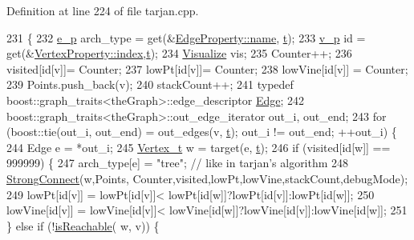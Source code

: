 Definition at line 224 of file tarjan.\+cpp.


\begin{DoxyCode}
231                                             \{
232     \hyperlink{utilities_8h_afdd46ecdd7dd04aa38394e7af744a510}{e\_p} arch\_type = \textcolor{keyword}{get}(&\hyperlink{struct_utility_structs_1_1_edge_property_a0701d898f719b1efbf795d80f503de81}{EdgeProperty::name}, \hyperlink{class_tarjan_a54b0703f885a3514ea0bf4cdbc7fdaad}{t});
233     \hyperlink{utilities_8h_a3f4959b3d837fa6351a9414c79280286}{v\_p} \textcolor{keywordtype}{id} = \textcolor{keyword}{get}(&\hyperlink{struct_utility_structs_1_1_vertex_property_a636cb729438e999aa3d9a17ac39d8641}{VertexProperty::index},\hyperlink{class_tarjan_a54b0703f885a3514ea0bf4cdbc7fdaad}{t});
234     \hyperlink{class_visualize}{Visualize} vis;
235     Counter++;
236     visited[\textcolor{keywordtype}{id}[v]]= Counter;
237     lowPt[\textcolor{keywordtype}{id}[v]]= Counter;
238     lowVine[\textcolor{keywordtype}{id}[v]] = Counter;
239     Points.push\_back(v);
240     stackCount++;
241     \textcolor{keyword}{typedef} boost::graph\_traits<theGraph>::edge\_descriptor \hyperlink{class_graph_component_aa7517b2af08aa717324076a645c73fe6}{Edge};
242     boost::graph\_traits<theGraph>::out\_edge\_iterator out\_i, out\_end;
243     \textcolor{keywordflow}{for} (boost::tie(out\_i, out\_end) = out\_edges(v, \hyperlink{class_tarjan_a54b0703f885a3514ea0bf4cdbc7fdaad}{t}); out\_i != out\_end; ++out\_i) \{
244         Edge e = *out\_i;
245         \hyperlink{utilities_8h_a344cd987714d06997f0becda3c96d6e2}{Vertex\_t} w = target(e, \hyperlink{class_tarjan_a54b0703f885a3514ea0bf4cdbc7fdaad}{t});
246         \textcolor{keywordflow}{if} (visited[\textcolor{keywordtype}{id}[w]] == 999999) \{
247             arch\_type[e] = \textcolor{stringliteral}{"tree"}; \textcolor{comment}{// like in tarjan's algorithm}
248             \hyperlink{class_tarjan_ac76fd1419a2de2dbf34c6ff1d4cc55e2}{StrongConnect}(w,Points, Counter,visited,lowPt,lowVine,stackCount,debugMode);
249             lowPt[\textcolor{keywordtype}{id}[v]] = lowPt[\textcolor{keywordtype}{id}[v]]< lowPt[\textcolor{keywordtype}{id}[w]]?lowPt[\textcolor{keywordtype}{id}[v]]:lowPt[\textcolor{keywordtype}{id}[w]];
250             lowVine[\textcolor{keywordtype}{id}[v]] = lowVine[\textcolor{keywordtype}{id}[v]]< lowVine[\textcolor{keywordtype}{id}[w]]?lowVine[\textcolor{keywordtype}{id}[v]]:lowVine[\textcolor{keywordtype}{id}[w]];
251         \} \textcolor{keywordflow}{else} \textcolor{keywordflow}{if} (!\hyperlink{class_tarjan_a74f69dfaa1d4cf3bac06aef7a704c0b8}{isReachable}( w, v)) \{

\end{DoxyCode}
